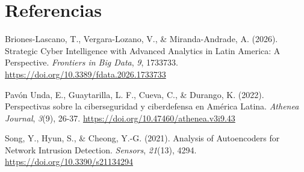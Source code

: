 \documentclass[
  11pt,
]{article}
\newlength{\cslhangindent}
\newlength{\cslentryspacingunit} %
\newenvironment{CSLReferences}[2] %
 {%
  \setlength{\parindent}{0pt}
  \ifodd #1
  \let\oldpar\par
  \def\par{\hangindent=\cslhangindent\oldpar}
  \fi
  \setlength{\parskip}{#2\cslentryspacingunit}
 }%
 {}
\begin{document}
\hypertarget{referencias}{%
\section*{Referencias}\label{referencias}}

\hypertarget{refs}{}
\begin{CSLReferences}{1}{0}
\leavevmode{}%
Briones-Lascano, T., Vergara-Lozano, V., \& Miranda-Andrade, A. (2026). Strategic Cyber Intelligence with Advanced Analytics in Latin America: A Perspective. \emph{Frontiers in Big Data}, \emph{9}, 1733733. \url{https://doi.org/10.3389/fdata.2026.1733733}

\leavevmode{}%
Pavón Unda, E., Guaytarilla, L. F., Cueva, C., \& Durango, K. (2022). Perspectivas sobre la ciberseguridad y ciberdefensa en América Latina. \emph{Athenea Journal}, \emph{3}(9), 26-37. \url{https://doi.org/10.47460/athenea.v3i9.43}

\leavevmode{}%
Song, Y., Hyun, S., \& Cheong, Y.-G. (2021). Analysis of Autoencoders for Network Intrusion Detection. \emph{Sensors}, \emph{21}(13), 4294. \url{https://doi.org/10.3390/s21134294}

\end{CSLReferences}
\end{document}
